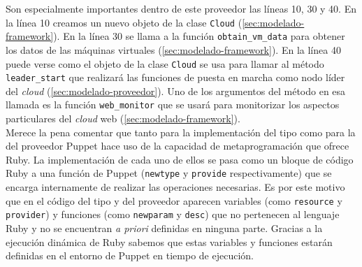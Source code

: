 Son especialmente importantes dentro de este proveedor las líneas 10, 30 y 40. En la línea 10 creamos un nuevo objeto de la clase \texttt{Cloud} (\ref{sec:modelado-framework}). En la línea 30 se llama a la función \texttt{obtain\_vm\_data} para obtener los datos de las máquinas virtuales (\ref{sec:modelado-framework}). En la línea 40 puede verse como el objeto de la clase \texttt{Cloud} se usa para llamar al método \texttt{leader\_start} que realizará las funciones de puesta en marcha como nodo líder del \emph{cloud} (\ref{sec:modelado-proveedor}). Uno de los argumentos del método en esa llamada es la función \texttt{web\_monitor} que se usará para monitorizar los aspectos particulares del \emph{cloud} web (\ref{sec:modelado-framework}). \\

Merece la pena comentar que tanto para la implementación del tipo como para la del proveedor Puppet hace uso de la capacidad de metaprogramación que ofrece Ruby. La implementación de cada uno de ellos se pasa como un bloque de código Ruby a una función de Puppet (\texttt{newtype} y \texttt{provide} respectivamente) que se encarga internamente de realizar las operaciones necesarias. Es por este motivo que en el código del tipo y del proveedor aparecen variables (como \texttt{resource} y \texttt{provider}) y funciones (como \texttt{newparam} y \texttt{desc}) que no pertenecen al lenguaje Ruby y no se encuentran \emph{a priori} definidas en ninguna parte. Gracias a la ejecución dinámica de Ruby sabemos que estas variables y funciones estarán definidas en el entorno de Puppet en tiempo de ejecución.


